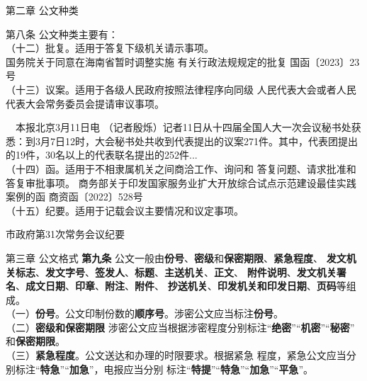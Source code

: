 \documentclass[aspectratio=169]{beamer}
\begin{document}
    \begin{frame}[t]{第二章 公文种类} \vspace{20pt}

        第八条 公文种类主要有：\\
        （十二）批复。适用于答复下级机关请示事项。\\
        {\scriptsize
        国务院关于同意在海南省暂时调整实施
        有关行政法规规定的批复
        国函〔2023〕23号
        }\\


        （十三）议案。适用于各级人民政府按照法律程序向同级
        人民代表大会或者人民代表大会常务委员会提请审议事项。

        {\scriptsize
        　本报北京3月11日电  （记者殷烁）记者11日从十四届全国人大一次会议秘书处获悉：到3月7日12时，大会秘书处共收到代表提出的议案271件。其中，代表团提出的19件，30名以上的代表联名提出的252件...
        }\\


        （十四）函。适用于不相隶属机关之间商洽工作、询问和
        答复问题、请求批准和答复审批事项。
        {\scriptsize
        商务部关于印发国家服务业扩大开放综合试点示范建设最佳实践案例的函
        商资函〔2022〕528号
        }\\


        （十五）纪要。适用于记载会议主要情况和议定事项。

        {\scriptsize 
        市政府第31次常务会议纪要
        }

    \end{frame}



    \begin{frame}[t]{第三章 公文格式} \vspace{20pt}
        \textbf{第九条} 公文一般由\textbf{份号}、\textbf{密级}和\textbf{保密期限}、\textbf{紧急程度}、
        \textbf{发文机关标志}、\textbf{发文字号}、\textbf{签发人}、\textbf{标题}、\textbf{主送机关}、\textbf{正文}、
        \textbf{附件说明}、\textbf{发文机关署名}、\textbf{成文日期}、\textbf{印章}、\textbf{附注}、\textbf{附件}、
        \textbf{抄送机关}、\textbf{印发机关和印发日期}、\textbf{页码}等组成。\\
        （一）\textbf{份号}。公文印制份数的\textbf{顺序号}。涉密公文应当标注\textbf{份号}。\\
        （二）\textbf{密级和保密期限}
        涉密公文应当根据涉密程度分别标注“\textbf{绝密}”“\textbf{机密}”“\textbf{秘密}”
        和\textbf{保密期限}。\\
        （三）\textbf{紧急程度}。公文送达和办理的时限要求。根据紧急
        程度，紧急公文应当分别标注“\textbf{特急}”“\textbf{加急}”，电报应当分别
        标注“\textbf{特提}”“\textbf{特急}”“\textbf{加急}”“\textbf{平急}”。\\
    \end{frame}
\end{document}
